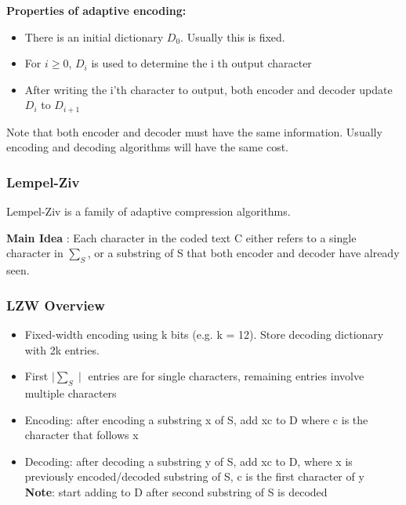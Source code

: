 \documentclass{article}
\begin{document}
\textbf{Properties of adaptive encoding:}
\begin{itemize}
\item There is an initial dictionary \(D_0\). Usually this is fixed.
\item For \(i \geq 0\), \(D_i\) is used to determine the i th output character
\item After writing the i'th character to output, both encoder and decoder
update \(D_i\) to \(D_{i+1}\)
\end{itemize}
Note that both encoder and decoder must have the same information.
Usually encoding and decoding algorithms will have the same cost.

\subsubsection*{Lempel-Ziv}
Lempel-Ziv is a family of adaptive compression algorithms.

\textbf{Main Idea} : Each character in the coded text C either
refers to a single character in \(\sum_S\), or a substring of S
that both encoder and decoder have already seen.


\subsubsection*{LZW Overview}
\begin{itemize}
\item Fixed-width encoding using k bits (e.g. k = 12).
Store decoding dictionary with 2k entries.
\item First \(\mid \sum_S \mid\) entries are for single characters, remaining entries involve multiple characters
\item Encoding: after encoding a substring x of S, add xc to D where c is the character that follows x
\item Decoding: after decoding a substring y of S, add xc to D, where x is previously encoded/decoded substring of S, c is the first character of y\\
\textbf{Note}: start adding to D after second substring of S is decoded
\end{itemize}
\end{document}
